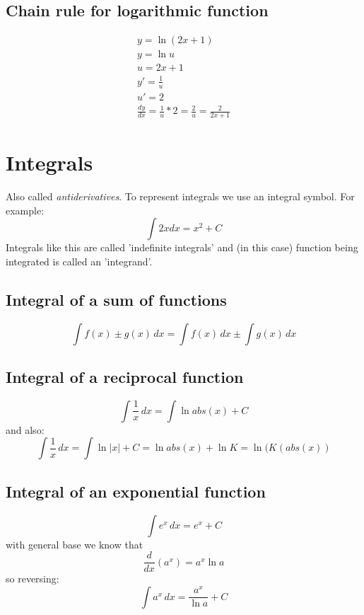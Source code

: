 \documentclass{article}
\begin{document}
\subsection{Chain rule for logarithmic function}
\begin{equation}
  \begin{gathered}
  y = \ln(2x+1) \\
  y = \ln u \\
  u = 2x+1 \\
  y' = \frac{1}{u} \\
  u' = 2 \\
  \frac{dy}{dx} = \frac{1}{u} * 2 = \frac{2}{u} = \frac{2}{2x+1}
  \end{gathered}
\end{equation}

\section{Integrals}
Also called \textit{antiderivatives}. To represent integrals we use an integral
symbol. For example:
\begin{equation}
  \int 2x dx = x^2 + C
\end{equation}
Integrals like this are called 'indefinite integrals' and (in this case)
function being integrated is called an 'integrand'.

\subsection{Integral of a sum of functions}
\begin{equation}
  \int f(x) \pm g(x) \, dx = \int f(x) \, dx \pm \int g(x) \, dx
\end{equation}

\subsection{Integral of a reciprocal function}
\begin{equation}
  \int \frac{1}{x} \, dx = \int \ln abs(x) + C
\end{equation}
and also:
\begin{equation}
  \int \frac{1}{x} \, dx = \int \ln|x| + C = \ln abs(x) + \ln K = \ln (K (abs(x))
\end{equation}

\subsection{Integral of an exponential function}
\begin{equation}
  \int e^x \, dx = e^x + C
\end{equation}
with general base we know that
\begin{equation}
  \frac{d}{dx} (a^x) = a^x \ln a
\end{equation}
so reversing:
\begin{equation}
  \int a^x \, dx = \frac{a^x}{\ln a} + C
\end{equation}
\end{document}
